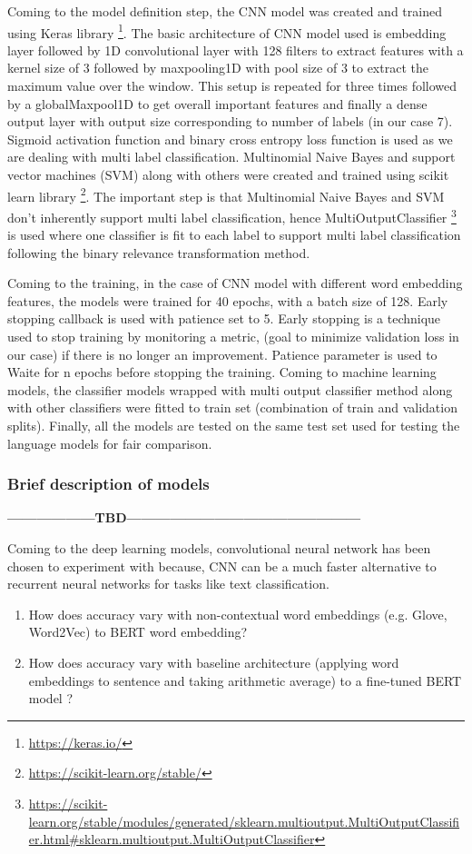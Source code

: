 Coming to the model definition step, the CNN model was created and trained using Keras library \footnote{\url{https://keras.io/}}. The basic architecture of CNN model used is embedding layer followed by 1D convolutional layer with 128 filters to extract features with a kernel size of 3 followed by maxpooling1D with pool size of 3 to extract the maximum value over the window. This setup is repeated for three times followed by a globalMaxpool1D to get overall important features and finally a dense output layer with output size corresponding to number of labels (in our case 7). Sigmoid activation function and binary cross entropy loss function is used as we are dealing with multi label classification. Multinomial Naive Bayes and support vector machines (SVM) along with others were created and trained using scikit learn library \footnote{\url{https://scikit-learn.org/stable/}}. The important step is that Multinomial Naive Bayes and SVM don't inherently support multi label classification, hence MultiOutputClassifier \footnote{\url{https://scikit-learn.org/stable/modules/generated/sklearn.multioutput.MultiOutputClassifier.html#sklearn.multioutput.MultiOutputClassifier}} is used where one classifier is fit to each label to support multi label classification following the binary relevance transformation method.

Coming to the training, in the case of CNN model with different word embedding features, the models were  trained for 40 epochs, with a batch size of 128. Early stopping callback is used with patience set to 5.
Early stopping is a technique used to stop training by monitoring a metric, (goal to minimize validation loss in our case) if there is no longer an improvement. Patience parameter is used to Waite for n epochs before stopping the training. Coming to machine learning models, the classifier models wrapped with multi output classifier method along with other classifiers were fitted to train set (combination of train and validation splits). Finally, all the models are tested on the same test set used for testing the language models for fair comparison.

\subsubsection{Brief description of models}
\textbf{------------------TBD------------------------------------------------}


Coming to the deep learning models, convolutional neural network has been chosen to experiment with because, CNN can be a much faster alternative to recurrent neural networks for tasks like text classification. 
\begin{enumerate}
    \item How does accuracy vary with non-contextual word embeddings (e.g. Glove, Word2Vec) to BERT word embedding?
    \item How does accuracy vary with baseline architecture (applying word embeddings to sentence and taking arithmetic average) to a fine-tuned BERT model ?
\end{enumerate}

